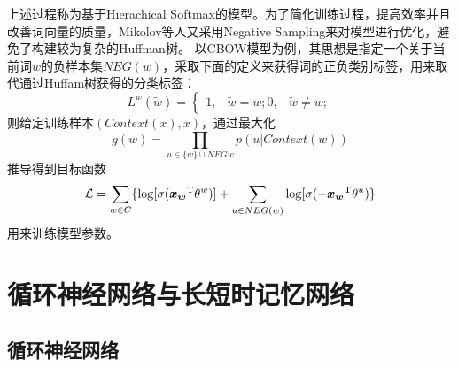 上述过程称为基于Hierachical Softmax的模型。为了简化训练过程，提高效率并且改善词向量的质量，Mikolov等人又采用Negative Sampling来对模型进行优化，避免了构建较为复杂的Huffman树。
以CBOW模型为例，其思想是指定一个关于当前词$w$的负样本集$NEG(w)$，采取下面的定义来获得词的正负类别标签，用来取代通过Huffam树获得的分类标签：
\begin{equation}
    L^w(\tilde{w}) = \left\{
        \begin{aligned}
            1, &\tilde{w} = w;
            0, &\tilde{w} \neq w;
        \end{aligned}
    \right.
\end{equation}
则给定训练样本$(Context(x), x)$，通过最大化
\begin{equation}
    g(w) = \prod_{u\in\{w\}\cup NEG{w}}p(u|Context(w))
\end{equation}
推导得到目标函数
\begin{equation}
    \mathcal{L} = \sum_{w\in C}\{\log[\sigma(\boldsymbol{x_w}^\mathrm{T}\theta^w)] + \sum_{u\in NEG(w)}\log[\sigma(-\boldsymbol{x_w}^\mathrm{T}\theta^u)\}
\end{equation}
用来训练模型参数。

\section{循环神经网络与长短时记忆网络}

\subsection{循环神经网络}
